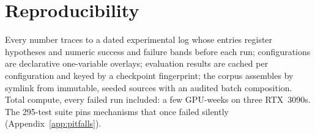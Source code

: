 \section{Reproducibility}
\label{sec:repro}

Every number traces to a dated experimental log whose entries register
hypotheses and numeric success and failure bands before each run;
configurations are declarative one-variable overlays; evaluation results
are cached per configuration and keyed by a checkpoint fingerprint; the
corpus assembles by symlink from immutable, seeded sources with an
audited batch composition. Total compute, every failed run included: a
few GPU-weeks on three RTX~3090s. The 295-test suite pins mechanisms
that once failed silently (Appendix~\ref{app:pitfalls}).
